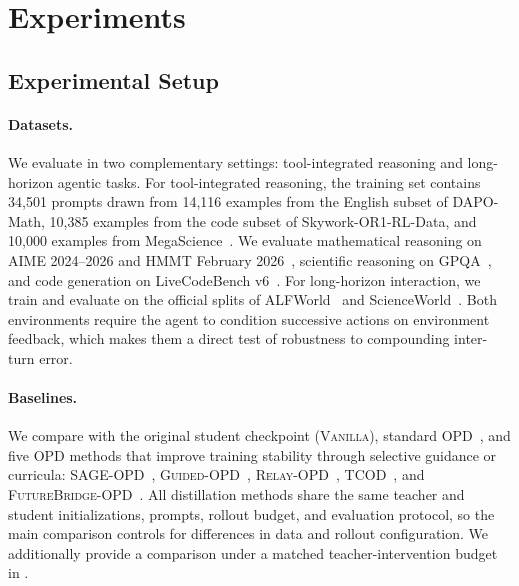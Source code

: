 \section{Experiments}
\label{sec:experiments}

\subsection{Experimental Setup}
\label{sec:experimental_setup}

\vspace{-0.5em}
\paragraph{Datasets.}
We evaluate \name in two complementary settings: tool-integrated reasoning and long-horizon agentic tasks.
For tool-integrated reasoning, the training set contains 34,501 prompts drawn from 14,116 examples from the English subset of DAPO-Math, 10,385 examples from the code subset of Skywork-OR1-RL-Data, and 10,000 examples from MegaScience~\citep{abs-2503-14476,abs-2505-22312,abs-2507-16812}. 
We evaluate mathematical reasoning on AIME 2024--2026 and HMMT February 2026~\citep{aime24,aime25,aime26,abs-2605-00674}, scientific reasoning on GPQA~\citep{abs-2311-12022}, and code generation on LiveCodeBench v6~\citep{JainHGLYZWSSS25}.
For long-horizon interaction, we train and evaluate on the official splits of ALFWorld~\citep{ShridharYCBTH21} and ScienceWorld~\citep{WangJCA22}.
Both environments require the agent to condition successive actions on environment feedback, which makes them a direct test of robustness to compounding inter-turn error.

\vspace{-0.5em}
\paragraph{Baselines.}
We compare \name with the original student checkpoint (\textsc{Vanilla}), standard \textsc{OPD}~\citep{AgarwalVZSGGB24,Gu0WH24}, and five OPD methods that improve training stability through selective guidance or curricula: \textsc{SAGE-OPD}~\citep{abs-2606-19659}, \textsc{Guided-OPD}~\citep{abs-2606-15912}, \textsc{Relay-OPD}~\citep{abs-2607-26057}, \textsc{TCOD}~\citep{abs-2604-24005}, and \textsc{FutureBridge-OPD}~\citep{abs-2608-01953}.
All distillation methods share the same teacher and student initializations, prompts, rollout budget, and evaluation protocol, so the main comparison controls for differences in data and rollout configuration.
We additionally provide a comparison under a matched teacher-intervention budget in .

